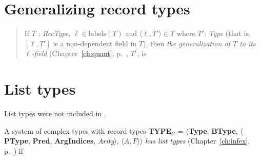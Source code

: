 \section{Generalizing record types}
\label{app:gen-rectypes}

\begin{quote}
If $T$ : \textit{RecType}, $\ell\in\text{labels}(T)$ and
$\langle\ell,T'\rangle\in T$ where $T'$: \textit{Type} (that is,
$[\ell,T']$ is a non-dependent field in $T$), then \textit{the
  generalization of $T$ to its $\ell$-field} (Chapter~\ref{ch:quant}, p.~\pageref{ex:gen-to-ell}, $T^\ell$, is
\begin{quote}
\end{quote}
\end{quote}

\section{List types}
\label{app:listtypes}

List types were not included in \cite{Cooper2012}.

A system of complex types with record types {\bf TYPE$_C$} = $\langle${\bf Type}, {\bf BType},
$\langle$\textbf{PType}, {\bf Pred}, \textbf{ArgIndices}, {\it
  Arity\/}$\rangle$, $\langle A,F\rangle$$\rangle$ \textit{has list
  types} (Chapter~\ref{ch:infex}, p.~\pageref{ex:listtypes}) if

